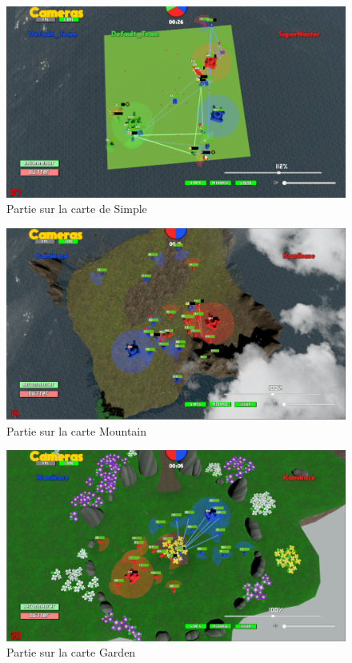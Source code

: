 \documentclass{report}
\begin{document}
\begin{figure}[h]
	\centering
		\includegraphics[scale=0.5]{SimpleDemo}
	\caption{Partie sur la carte de Simple}
\end{figure}

\begin{figure}[h]
	\centering
		\includegraphics[scale=0.4]{Montagne}
	\caption{Partie sur la carte Mountain}
\end{figure}

\begin{figure}[h]
	\centering
		\includegraphics[scale=0.4]{Garden}
	\caption{Partie sur la carte Garden}
\end{figure}

%
%
\end{document}
